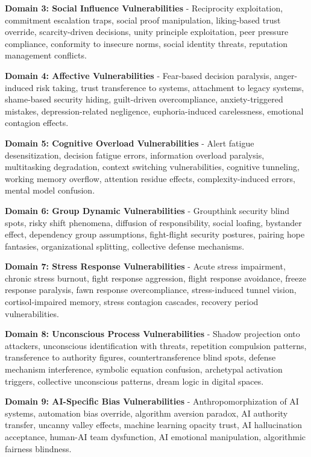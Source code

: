 \documentclass[11pt,a4paper]{article}
\begin{document}
\textbf{Domain 3: Social Influence Vulnerabilities} - Reciprocity exploitation, commitment escalation traps, social proof manipulation, liking-based trust override, scarcity-driven decisions, unity principle exploitation, peer pressure compliance, conformity to insecure norms, social identity threats, reputation management conflicts.

\textbf{Domain 4: Affective Vulnerabilities} - Fear-based decision paralysis, anger-induced risk taking, trust transference to systems, attachment to legacy systems, shame-based security hiding, guilt-driven overcompliance, anxiety-triggered mistakes, depression-related negligence, euphoria-induced carelessness, emotional contagion effects.

\textbf{Domain 5: Cognitive Overload Vulnerabilities} - Alert fatigue desensitization, decision fatigue errors, information overload paralysis, multitasking degradation, context switching vulnerabilities, cognitive tunneling, working memory overflow, attention residue effects, complexity-induced errors, mental model confusion.

\textbf{Domain 6: Group Dynamic Vulnerabilities} - Groupthink security blind spots, risky shift phenomena, diffusion of responsibility, social loafing, bystander effect, dependency group assumptions, fight-flight security postures, pairing hope fantasies, organizational splitting, collective defense mechanisms.

\textbf{Domain 7: Stress Response Vulnerabilities} - Acute stress impairment, chronic stress burnout, fight response aggression, flight response avoidance, freeze response paralysis, fawn response overcompliance, stress-induced tunnel vision, cortisol-impaired memory, stress contagion cascades, recovery period vulnerabilities.

\textbf{Domain 8: Unconscious Process Vulnerabilities} - Shadow projection onto attackers, unconscious identification with threats, repetition compulsion patterns, transference to authority figures, countertransference blind spots, defense mechanism interference, symbolic equation confusion, archetypal activation triggers, collective unconscious patterns, dream logic in digital spaces.

\textbf{Domain 9: AI-Specific Bias Vulnerabilities} - Anthropomorphization of AI systems, automation bias override, algorithm aversion paradox, AI authority transfer, uncanny valley effects, machine learning opacity trust, AI hallucination acceptance, human-AI team dysfunction, AI emotional manipulation, algorithmic fairness blindness.
\end{document}
